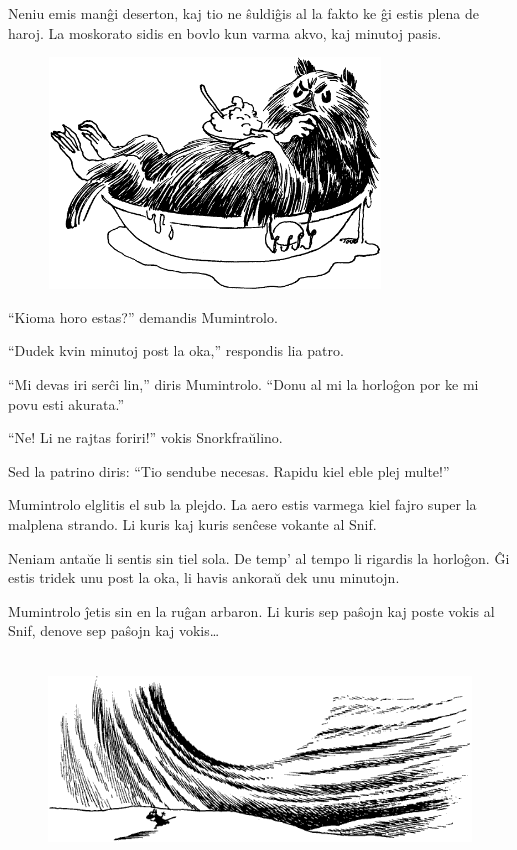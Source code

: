 Neniu emis manĝi deserton, kaj tio ne ŝuldiĝis al la fakto ke ĝi estis plena de haroj. La moskorato sidis en bovlo kun varma akvo, kaj minutoj pasis.

\begin{figure}[htbp]
\centering
\includegraphics[width=250pt,height=174pt]{9-8.png}
\caption{}
\label{9-8}
\end{figure}

``Kioma horo estas?'' demandis Mumintrolo.

``Dudek kvin minutoj post la oka,'' respondis lia patro.

``Mi devas iri serĉi lin,'' diris Mumintrolo. ``Donu al mi la horloĝon por ke mi povu esti akurata.''

``Ne! Li ne rajtas foriri!'' vokis Snorkfraŭlino.

Sed la patrino diris: ``Tio sendube necesas. Rapidu kiel eble plej multe!''

Mumintrolo elglitis el sub la plejdo. La aero estis varmega kiel fajro super la malplena strando. Li kuris kaj kuris senĉese vokante al Snif.

Neniam antaŭe li sentis sin tiel sola. De temp' al tempo li rigardis la horloĝon. Ĝi estis tridek unu post la oka, li havis ankoraŭ dek unu minutojn.

Mumintrolo ĵetis sin en la ruĝan arbaron. Li kuris sep paŝojn kaj poste vokis al Snif, denove sep paŝojn kaj vokis{\ldots}

\begin{figure}[htbp]
\centering
\includegraphics[width=400pt,height=156pt]{9-9.png}
\caption{}
\label{9-9}
\end{figure}


